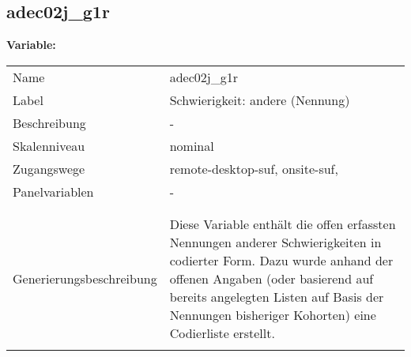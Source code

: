 	
	
	\subsection{adec02j\_g1r}
	\label{subSection:adec02j_g1r}

	\noindent\textbf{Variable:}\\
		\begin{tabular}{lL{11.3cm}}
			\label{tableVariable:adec02j_g1r}
			Name & adec02j\_g1r \\
			Label & Schwierigkeit: andere (Nennung) \\
			Beschreibung & - \\
			Skalenniveau & nominal \\
			Zugangswege &
				remote-desktop-suf,
				onsite-suf,
 \\
			Panelvariablen & -
			 \\
			 \\
 \\
					Generierungsbeschreibung & Diese Variable enthält die offen erfassten Nennungen anderer Schwierigkeiten in codierter Form. Dazu wurde anhand der offenen Angaben (oder basierend auf bereits angelegten Listen auf Basis der Nennungen bisheriger Kohorten) eine Codierliste erstellt.
				 \\	
			 \\
		\end{tabular}






